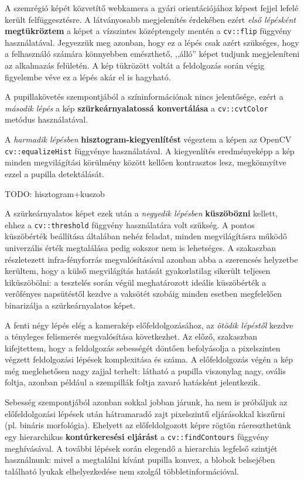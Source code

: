 \bigskip

A szemrégió képét közvetítő webkamera a gyári orientációjához képest fejjel lefelé került felfüggesztésre. A látványosabb megjelenítés érdekében ezért \emph{első lépésként} \textbf{megtükröztem} a képet a vízszintes középtengely mentén a \texttt{cv::flip} függvény használatával. Jegyezzük meg azonban, hogy ez a lépés csak azért szükséges, hogy a felhasználó számára könnyebben emészthető, ,,álló'' képet tudjunk megjeleníteni az alkalmazás felületén. A kép tükrözött voltát a feldolgozás során végig figyelembe véve ez a lépés akár el is hagyható.

A pupillakövetés szempontjából a színinformációnak nincs jelentősége, ezért a \emph{második lépés} a kép \textbf{szürkeárnyalatossá konvertálása} a \texttt{cv::cvtColor} metódus használatával.

A \emph{harmadik lépésben} \textbf{hisztogram-kiegyenlítést} végeztem a képen az OpenCV \texttt{cv::equalizeHist} függvénye használatával. A kiegyenlítés eredményeképp a kép minden megvilágítási körülmény között kellően kontrasztos lesz, megkönnyítve ezzel a pupilla detektálását.

TODO: hisztogram+kuszob

A szürkeárnyalatos képet ezek után a \emph{negyedik lépésben} \textbf{küszöbözni} kellett, ehhez a \texttt{cv::threshold} függvény használatára volt szükség. A pontos küszöbérték beállítása általában nehéz feladat, minden megvilágításra működő univerzális érték megtalálása pedig sokszor nem is lehetséges. A  szakaszban részletezett infra-fényforrás megvalósításával azonban abba a szerencsés helyzetbe kerültem, hogy a külső megvilágítás hatását gyakorlatilag sikerült teljesen kiküszöbölni: a tesztelés során végül meghatározott ideális küszöbérték a verőfényes napsütéstől kezdve a vaksötét szobáig minden esetben megfelelően binarizálja a szürkeárnyalatos képet.

\bigskip

A fenti négy lépés elég a kamerakép előfeldolgozásához, az \emph{ötödik lépéstől} kezdve a tényleges felismerés megvalósítása következhet. Az előző,  szakaszban kifejtettem, hogy a feldolgozás sebességét döntően befolyásolja a pixelszinten végzett feldolgozási lépések komplexitása és száma. A előfeldolgozás végén a kép még meglehetősen nagy zajjal terhelt: látható a pupilla viszonylag nagy, ovális foltja, azonban például a szempillák foltja zavaró hatásként jelentkezik.

Sebesség szempontjából azonban sokkal jobban járunk, ha nem is próbáljuk az előfeldolgozási lépések után hátramaradó zajt pixelszintű eljárásokkal kiszűrni (pl. bináris morfológia). Ehelyett az előfeldolgozott képre rögtön ráereszthetünk egy hierarchikus \textbf{kontúrkeresési eljárást} a \texttt{cv::findContours} függvény meghívásával. A további lépések során elegendő a hierarchia legfelső szintjét használnunk: mivel a megtalálni kívánt pupilla konvex, a blobok belsejében található lyukak elhelyezkedése nem szolgál többletinformációval.

